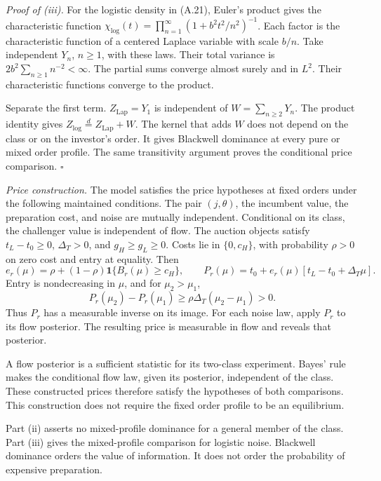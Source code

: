 \emph{Proof of (iii).} For the logistic density in (A.21), Euler's product gives the characteristic function
\(\chi_{\mathrm{log}}(t)=\prod_{n=1}^{\infty}(1+b^2t^2/n^2)^{-1}\).
Each factor is the characteristic function of a centered Laplace variable with scale \(b/n\).
Take independent \(Y_n\), \(n\ge1\), with these laws.
Their total variance is \(2b^2\sum_{n\ge1}n^{-2}<\infty\).
The partial sums converge almost surely and in \(L^2\).
Their characteristic functions converge to the product.
\par
Separate the first term.
\(Z_{\mathrm{Lap}}=Y_1\) is independent of \(W=\sum_{n\ge2}Y_n\).
The product identity gives \(Z_{\mathrm{log}}\overset d=Z_{\mathrm{Lap}}+W\).
The kernel that adds \(W\) does not depend on the class or on the investor's order.
It gives Blackwell dominance at every pure or mixed order profile.
The same transitivity argument proves the conditional price comparison. \(\square\)

\emph{Price construction.}
The model satisfies the price hypotheses at fixed orders under the following maintained conditions.
The pair \((j,\theta)\), the incumbent value, the preparation cost, and noise are mutually independent.
Conditional on its class, the challenger value is independent of flow.
The auction objects satisfy \(t_L-t_0\ge0\), \(\Delta_T>0\), and \(g_H\ge g_L\ge0\).
Costs lie in \(\{0,c_H\}\), with probability \(\rho>0\) on zero cost and entry at equality.
Then
\[
e_r(\mu)=\rho+(1-\rho)\mathbf1\{B_r(\mu)\ge c_H\},\qquad
P_r(\mu)=t_0+e_r(\mu)[t_L-t_0+\Delta_T\mu].
\]
Entry is nondecreasing in \(\mu\), and for \(\mu_2>\mu_1\),
\[
P_r(\mu_2)-P_r(\mu_1)\ge\rho\Delta_T(\mu_2-\mu_1)>0.
\]
Thus \(P_r\) has a measurable inverse on its image.
For each noise law, apply \(P_r\) to its flow posterior.
The resulting price is measurable in flow and reveals that posterior.
\par
A flow posterior is a sufficient statistic for its two-class experiment.
Bayes' rule makes the conditional flow law, given its posterior, independent of the class.
These constructed prices therefore satisfy the hypotheses of both comparisons.
This construction does not require the fixed order profile to be an equilibrium.

Part (ii) asserts no mixed-profile dominance for a general member of the class.
Part (iii) gives the mixed-profile comparison for logistic noise.
Blackwell dominance orders the value of information.
It does not order the probability of expensive preparation.
